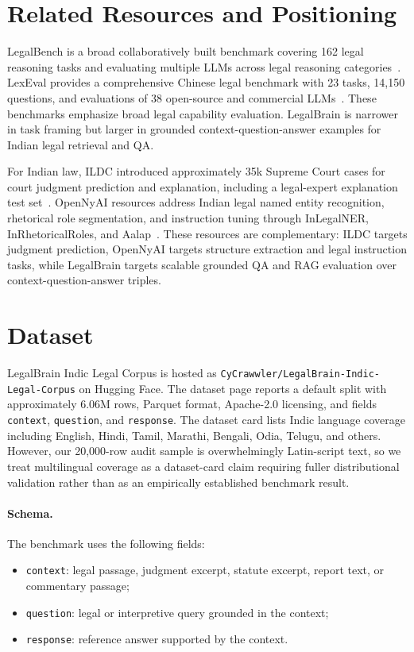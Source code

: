 \documentclass{article}
\begin{document}
\section{Related Resources and Positioning}

LegalBench is a broad collaboratively built benchmark covering 162 legal reasoning tasks and evaluating multiple LLMs across legal reasoning categories~\citep{legalbench}. LexEval provides a comprehensive Chinese legal benchmark with 23 tasks, 14,150 questions, and evaluations of 38 open-source and commercial LLMs~\citep{lexeval}. These benchmarks emphasize broad legal capability evaluation. LegalBrain is narrower in task framing but larger in grounded context-question-answer examples for Indian legal retrieval and QA.

For Indian law, ILDC introduced approximately 35k Supreme Court cases for court judgment prediction and explanation, including a legal-expert explanation test set~\citep{ildc}. OpenNyAI resources address Indian legal named entity recognition, rhetorical role segmentation, and instruction tuning through InLegalNER, InRhetoricalRoles, and Aalap~\citep{inlegalner,inrhetoricalroles,aalap}. These resources are complementary: ILDC targets judgment prediction, OpenNyAI targets structure extraction and legal instruction tasks, while LegalBrain targets scalable grounded QA and RAG evaluation over context-question-answer triples.

\section{Dataset}

LegalBrain Indic Legal Corpus is hosted as \texttt{CyCrawwler/LegalBrain-Indic-Legal-Corpus} on Hugging Face. The dataset page reports a default split with approximately 6.06M rows, Parquet format, Apache-2.0 licensing, and fields \texttt{context}, \texttt{question}, and \texttt{response}. The dataset card lists Indic language coverage including English, Hindi, Tamil, Marathi, Bengali, Odia, Telugu, and others. However, our 20,000-row audit sample is overwhelmingly Latin-script text, so we treat multilingual coverage as a dataset-card claim requiring fuller distributional validation rather than as an empirically established benchmark result.

\paragraph{Schema.}
The benchmark uses the following fields:
\begin{itemize}
    \item \texttt{context}: legal passage, judgment excerpt, statute excerpt, report text, or commentary passage;
    \item \texttt{question}: legal or interpretive query grounded in the context;
    \item \texttt{response}: reference answer supported by the context.
\end{itemize}
\end{document}
